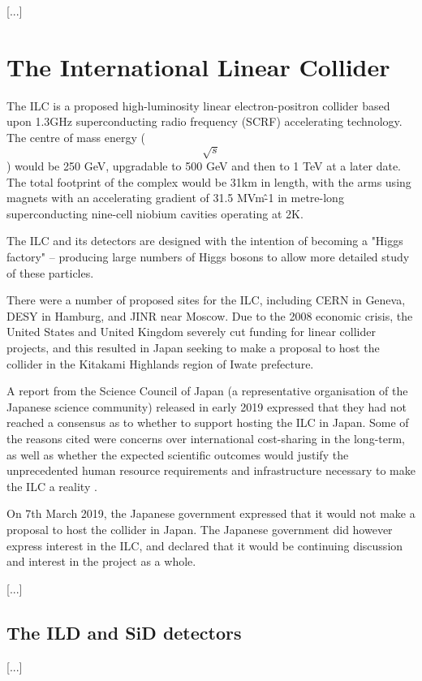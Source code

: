 [...]

\section{The International Linear Collider}
The \acrfull{ILC} is a proposed high-luminosity linear electron-positron collider based upon 1.3GHz superconducting radio frequency (SCRF) accelerating technology. The centre of mass energy ($$\sqrt{s}$$) would be 250 GeV, upgradable to 500 GeV and then to 1 TeV at a later date. The total footprint of the complex would be 31km in length, with the arms using magnets with an accelerating gradient of 31.5 MVm\^{-1} in metre-long superconducting nine-cell niobium cavities operating at 2K.

The ILC and its detectors are designed with the intention of becoming a "Higgs factory" -- producing large numbers of Higgs bosons to allow more detailed study of these particles.

There were a number of proposed sites for the ILC, including CERN in Geneva, DESY in Hamburg, and \acrshort{JINR} near Moscow. Due to the 2008 economic crisis, the United States and United Kingdom severely cut funding for linear collider projects, and this resulted in Japan seeking to make a proposal to host the collider in the Kitakami Highlands region of Iwate prefecture. 

A report from the Science Council of Japan (a representative organisation of the Japanese science community) released in early 2019 expressed that they had not reached a consensus as to whether to support hosting the ILC in Japan. Some  of the reasons cited were concerns over international cost-sharing in the long-term, as well as whether the expected scientific outcomes would justify the unprecedented human resource requirements and infrastructure necessary to make the ILC a reality \cite{linearcolliders-scj-report}.

On 7th March 2019, the Japanese government expressed that it would not make a proposal to host the collider in Japan. The Japanese government did however express interest in the ILC, and declared that it would be continuing discussion and interest in the project as a whole.

[...]

\subsection{The ILD and SiD detectors}
[...]

